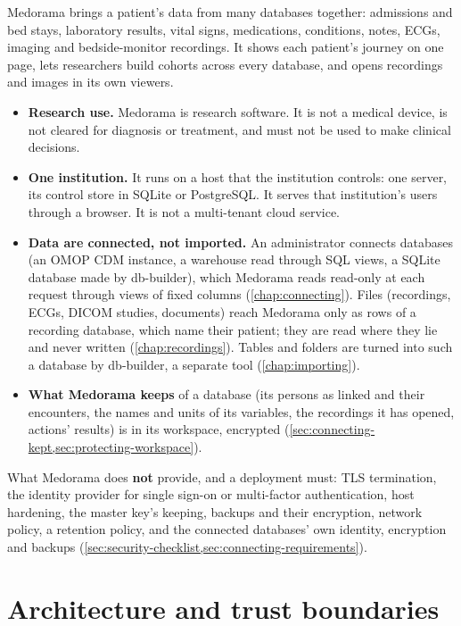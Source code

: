 Medorama brings a patient's data from many databases together: admissions and bed stays,
laboratory results, vital signs, medications, conditions, notes, ECGs, imaging and bedside-monitor
recordings. It shows each patient's journey on one page, lets researchers build cohorts across
every database, and opens recordings and images in its own viewers.
\begin{itemize}
\item \textbf{Research use.} Medorama is research software. It is not a medical device, is not
  cleared for diagnosis or treatment, and must not be used to make clinical decisions.
\item \textbf{One institution.} It runs on a host that the institution controls: one server, its
  control store in SQLite or PostgreSQL. It serves that institution's users through a browser. It
  is not a multi-tenant cloud service.
\item \textbf{Data are connected, not imported.} An administrator connects databases (an OMOP CDM
  instance, a warehouse read through SQL views, a SQLite database made by db-builder), which
  Medorama reads read-only at each request through views of fixed columns
  (\cref{chap:connecting}). Files (recordings, ECGs, DICOM studies, documents) reach Medorama only
  as rows of a recording database, which name their patient; they are read where they lie and
  never written (\cref{chap:recordings}). Tables and folders are turned into such a database by
  db-builder, a separate tool (\cref{chap:importing}).
\item \textbf{What Medorama keeps} of a database (its persons as linked and their encounters,
  the names and units of its variables, the recordings it has opened, actions' results) is in its
  workspace, encrypted (\cref{sec:connecting-kept,sec:protecting-workspace}).
\end{itemize}
What Medorama does \textbf{not} provide, and a deployment must: TLS termination, the identity
provider for single sign-on or multi-factor authentication, host hardening, the master key's
keeping, backups and their encryption, network policy, a retention policy, and the connected
databases' own identity, encryption and backups
(\cref{sec:security-checklist,sec:connecting-requirements}).

\section{Architecture and trust boundaries}
\label{sec:security-boundaries}

